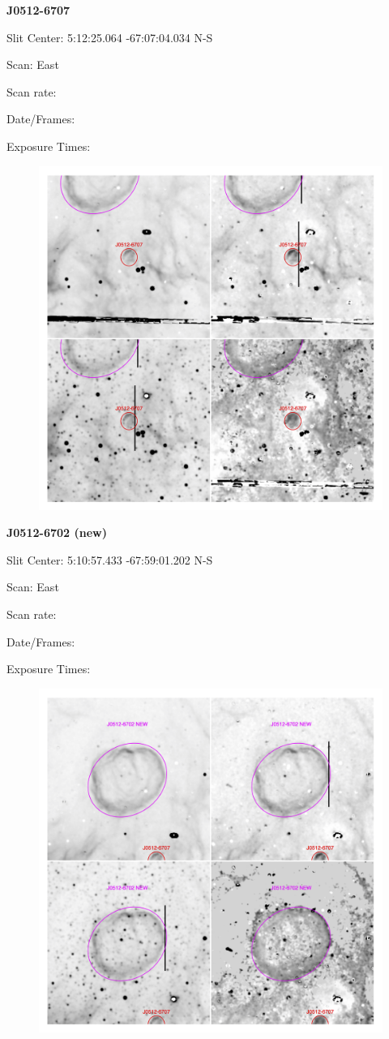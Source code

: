 \documentclass[11pt]{article}
\begin{document}
\newpage
{\bf J0512-6707}  
 
Slit Center:   5:12:25.064  -67:07:04.034    N-S 

Scan:  East

Scan rate:  

Date/Frames:

Exposure Times:  

\begin{figure}
\includegraphics[width=11.cm]{snapshots/J0512-6707.png}
\end{figure}

\newpage
{\bf J0512-6702 (new)}  
 
Slit Center:   5:10:57.433   -67:59:01.202    N-S 

Scan:  East

Scan rate:  

Date/Frames:

Exposure Times:  

\begin{figure}
\includegraphics[width=11.cm]{snapshots/J0512-6702.png}
\end{figure}
\end{document}
